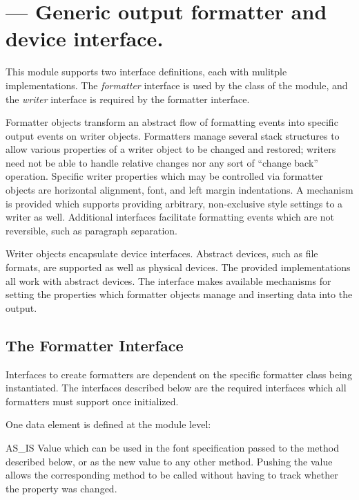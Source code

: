 \section{ ---
         Generic output formatter and device interface.}




This module supports two interface definitions, each with mulitple
implementations.  The \emph{formatter} interface is used by the
 class of the  module, and the
\emph{writer} interface is required by the formatter interface.

Formatter objects transform an abstract flow of formatting events into
specific output events on writer objects.  Formatters manage several
stack structures to allow various properties of a writer object to be
changed and restored; writers need not be able to handle relative
changes nor any sort of ``change back'' operation.  Specific writer
properties which may be controlled via formatter objects are
horizontal alignment, font, and left margin indentations.  A mechanism
is provided which supports providing arbitrary, non-exclusive style
settings to a writer as well.  Additional interfaces facilitate
formatting events which are not reversible, such as paragraph
separation.

Writer objects encapsulate device interfaces.  Abstract devices, such
as file formats, are supported as well as physical devices.  The
provided implementations all work with abstract devices.  The
interface makes available mechanisms for setting the properties which
formatter objects manage and inserting data into the output.


\subsection{The Formatter Interface}

Interfaces to create formatters are dependent on the specific
formatter class being instantiated.  The interfaces described below
are the required interfaces which all formatters must support once
initialized.

One data element is defined at the module level:


\begin{datadesc}{AS_IS}
Value which can be used in the font specification passed to the
 method described below, or as the new value to any
other  method.  Pushing the 
value allows the corresponding  method to
be called without having to track whether the property was changed.
\end{datadesc}

